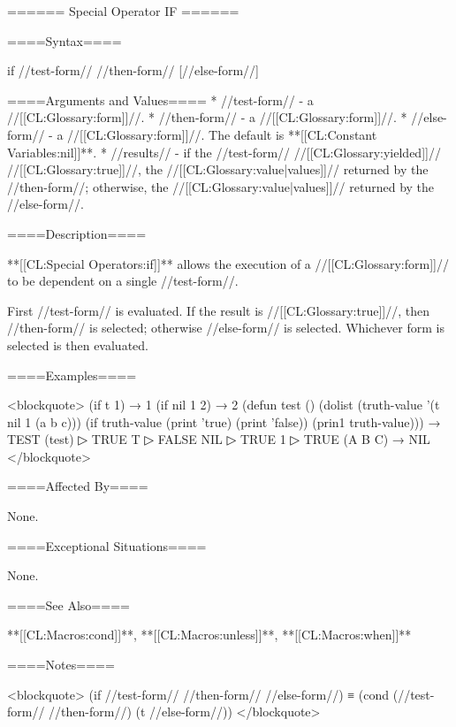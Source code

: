 ====== Special Operator IF ======

====Syntax====

\DefspecWithValues if {//test-form// //then-form// [//else-form//]} {}

====Arguments and Values====
  * //test-form// - a //[[CL:Glossary:form]]//.
  * //then-form// - a //[[CL:Glossary:form]]//.
  * //else-form// - a //[[CL:Glossary:form]]//. The default is **[[CL:Constant Variables:nil]]**.
  * //results// - if the //test-form// //[[CL:Glossary:yielded]]// //[[CL:Glossary:true]]//, the //[[CL:Glossary:value|values]]// returned by the //then-form//; otherwise, the //[[CL:Glossary:value|values]]// returned by the //else-form//.

====Description====

**[[CL:Special Operators:if]]** allows the execution of a //[[CL:Glossary:form]]// to be dependent on a single //test-form//.

First //test-form// is evaluated. If the result is //[[CL:Glossary:true]]//, then //then-form// is selected; otherwise //else-form// is selected. Whichever form is selected is then evaluated.

====Examples====

<blockquote> (if t 1) → 1 (if nil 1 2) → 2 (defun test () (dolist (truth-value '(t nil 1 (a b c))) (if truth-value (print 'true) (print 'false)) (prin1 truth-value))) → TEST (test)
▷ TRUE T
▷ FALSE NIL
▷ TRUE 1
▷ TRUE (A B C) → NIL </blockquote>

====Affected By====

None.

====Exceptional Situations====

None.

====See Also====

**[[CL:Macros:cond]]**, **[[CL:Macros:unless]]**, **[[CL:Macros:when]]**

====Notes====

<blockquote> (if //test-form// //then-form// //else-form//) ≡ (cond (//test-form// //then-form//) (t //else-form//)) </blockquote>

